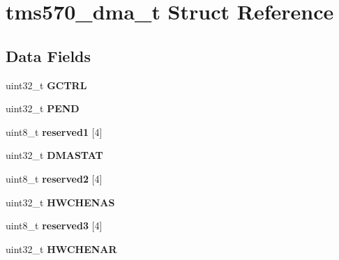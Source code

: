 \hypertarget{structtms570__dma__t}{}\section{tms570\+\_\+dma\+\_\+t Struct Reference}
\label{structtms570__dma__t}
\subsection*{Data Fields}
\begin{DoxyCompactItemize}
\item 
\mbox{\label{structtms570__dma__t_ad49b27b0b63d3a5b63c949b60da81040}} 
uint32\+\_\+t {\bfseries G\+C\+T\+RL}
\item 
\mbox{\label{structtms570__dma__t_a170404916c7466826761c2f51e8911c0}} 
uint32\+\_\+t {\bfseries P\+E\+ND}
\item 
\mbox{\label{structtms570__dma__t_a7245c85ddebc90e773fd6a7c673a34eb}} 
uint8\+\_\+t {\bfseries reserved1} \mbox{[}4\mbox{]}
\item 
\mbox{\label{structtms570__dma__t_a70ed265aa605684b1200f693838a8d50}} 
uint32\+\_\+t {\bfseries D\+M\+A\+S\+T\+AT}
\item 
\mbox{\label{structtms570__dma__t_ac9f42870d9a3bdbf12022767dd9d572e}} 
uint8\+\_\+t {\bfseries reserved2} \mbox{[}4\mbox{]}
\item 
\mbox{\label{structtms570__dma__t_a61540d53e0fc918c6def69d491b00e1c}} 
uint32\+\_\+t {\bfseries H\+W\+C\+H\+E\+N\+AS}
\item 
\mbox{\label{structtms570__dma__t_a8d6e96afd26294299411c1873e4be57c}} 
uint8\+\_\+t {\bfseries reserved3} \mbox{[}4\mbox{]}
\item 
\mbox{\label{structtms570__dma__t_a32388abf19bb01fb31492d0dbce2aacc}} 
uint32\+\_\+t {\bfseries H\+W\+C\+H\+E\+N\+AR}
\item 
\mbox{\label{structtms570__dma__t_aa7771b4150c18d9071fbfe4962484042}} 

\end{DoxyCompactItemize}

